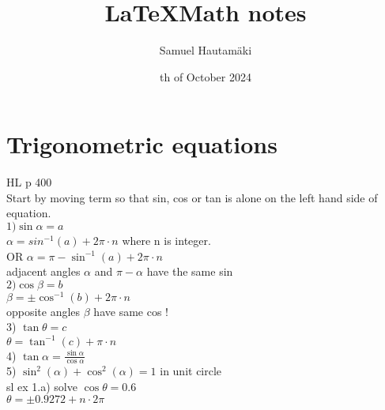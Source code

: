 \documentclass{article}
\title{\LaTeX Math notes}
\author{Samuel Hautamäki}
\date{th of October 2024}
\begin{document}
  \maketitle
   
  \section{Trigonometric equations}
  HL p 400\\
  Start by moving term so that sin, cos or tan is alone on the left hand side of equation.\\
  $1) \sin \alpha=a$\\
  $\alpha=sin^{-1}(a)+2\pi\cdot n$ where n is integer.\\
  OR $\alpha=\pi-\sin^{-1}(a)+2\pi\cdot n$\\
  adjacent angles $\alpha$ and $\pi-\alpha$ have the same sin\\
  $2) \cos \beta=b$\\
  $\beta=\pm\cos^{-1}(b)+ 2\pi\cdot n$\\
  opposite angles $\beta$ have same cos !\\
  3) $\tan \theta=c$\\
  $\theta=\tan^{-1}(c)+\pi\cdot n$\\
  4) $\tan \alpha=\frac{\sin\alpha}{\cos \alpha}$\\
  5) $\sin^2(\alpha)+\cos^2(\alpha)=1$ in unit circle\\ 
  sl ex 1.a) solve $\cos \theta = 0.6$\\
  $\theta=\pm0.9272+n\cdot 2\pi$\\
  

   
\end{document}
